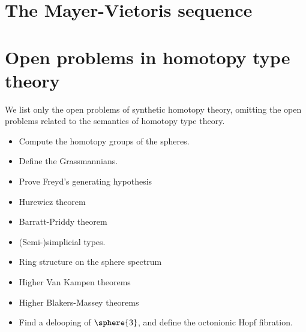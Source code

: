 \documentclass[11pt]{memoir} %
\begin{document}
\chapter{The Mayer-Vietoris sequence}

\chapter{Open problems in homotopy type theory}
We list only the open problems of synthetic homotopy theory, omitting the open problems related to the semantics of homotopy type theory.
\begin{itemize}
\item Compute the homotopy groups of the spheres.
\item Define the Grassmannians.
\item Prove Freyd's generating hypothesis
\item Hurewicz theorem
\item Barratt-Priddy theorem
\item (Semi-)simplicial types.
\item Ring structure on the sphere spectrum
\item Higher Van Kampen theorems
\item Higher Blakers-Massey theorems
\item Find a delooping of $\sphere{3}$, and define the octonionic Hopf fibration.
\end{itemize}

\end{document}
